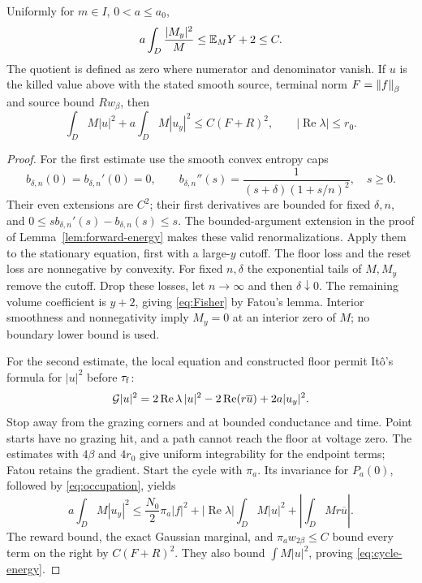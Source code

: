 \begin{lemma}\label{lem:cycle-energy}
Uniformly for $m\in I$, $0<a\le a_0$,
\begin{equation}\label{eq:Fisher}
 a\int_D\frac{|M_y|^2}{M}\le \mathbb E_M Y+2\le C.
\end{equation}
The quotient is defined as zero where numerator and denominator vanish.
If $u$ is the killed value above with the stated smooth source,
terminal norm $F=\left\|f\right\|_\beta$ and source bound $R w_\beta$, then
\begin{equation}\label{eq:cycle-energy}
 \int_D M|u|^2+a\int_D M|u_y|^2\le C(F+R)^2,
       \qquad |\operatorname{Re}\lambda|\le r_0.
\end{equation}
\end{lemma}

\begin{proof}
For the first estimate use the smooth convex entropy caps
\[
 b_{\delta,n}(0)=b_{\delta,n}'(0)=0,\qquad
 b_{\delta,n}''(s)=\frac1{(s+\delta)(1+s/n)^2},\quad s\ge0.
\]
Their even extensions are $C^2$; their first derivatives are bounded
for fixed $\delta,n$, and
$0\le s b_{\delta,n}'(s)-b_{\delta,n}(s)\le s$.
The bounded-argument extension in the proof of
Lemma~\ref{lem:forward-energy} makes these valid renormalizations.
Apply them to the stationary equation, first with a large-$y$ cutoff.
The floor loss and the reset loss are nonnegative by convexity.
For fixed $n,\delta$ the exponential tails of $M,M_y$ remove the
cutoff. Drop these losses, let $n\to\infty$ and then $\delta\downarrow0$.
The remaining volume coefficient is $y+2$, giving \eqref{eq:Fisher}
by Fatou's lemma. Interior smoothness and nonnegativity imply
$M_y=0$ at an interior zero of $M$; no boundary lower bound is used.

For the second estimate, the local equation and constructed floor permit
It\^o's formula for $|u|^2$ before ${\tau_{\mathrm f}}$:
\[
 \mathcal G|u|^2=2\operatorname{Re}\lambda\,|u|^2
                 -2\operatorname{Re}(r\overline u)+2a|u_y|^2.
\]
Stop away from the grazing corners and at bounded conductance and time.
Point starts have no grazing hit, and a path cannot reach the floor
at voltage zero. The estimates with $4\beta$ and $4r_0$ give uniform
integrability for the endpoint terms; Fatou retains the gradient.
Start the cycle with $\pi_a$. Its invariance for $P_a(0)$, followed by
\eqref{eq:occupation}, yields
\[
 a\int_D M|u_y|^2\le
 \frac{N_0}{2}\pi_a|f|^2+
 |\operatorname{Re}\lambda|\int_D M|u|^2+
 \left|\int_DMr\overline u\right|.
\]
The reward bound, the exact Gaussian marginal, and
$\pi_a w_{2\beta}\le C$ bound every term on the right by $C(F+R)^2$.
They also bound $\int M|u|^2$, proving \eqref{eq:cycle-energy}.
\end{proof}

